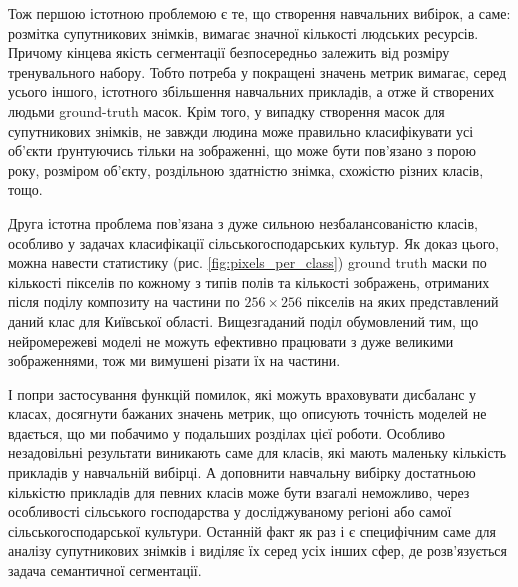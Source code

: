 Тож першою істотною проблемою є те, що створення
навчальних вибірок, а саме: розмітка супутникових знімків,
вимагає значної кількості людських ресурсів. Причому кінцева
якість сегментації безпосередньо залежить від
розміру тренувального набору. Тобто потреба у
покращені значень метрик вимагає, серед усього іншого,
істотного збільшення навчальних прикладів,
а отже й створених людьми ground-truth масок.
Крім того, у випадку створення масок для супутникових знімків,
не завжди людина може правильно класифікувати усі об'єкти ґрунтуючись
тільки на зображенні, що може бути пов'язано з порою року,
розміром об'єкту, роздільною здатністю знімка, схожістю різних класів, тощо.

Друга істотна проблема пов'язана з дуже сильною
незбалансованістю класів, особливо у задачах класифікації
сільськогосподарських культур. Як доказ цього, можна
навести статистику (рис. \ref{fig:pixels_per_class}) ground truth
маски по кількості пікселів по кожному з
типів полів та кількості зображень, отриманих після
поділу композиту на частини по $256 \times 256$ пікселів
на яких представлений даний клас для Київської області.
Вищезгаданий поділ обумовлений тим, що нейромережеві моделі не
можуть ефективно працювати з дуже великими зображеннями,
тож ми вимушені різати їх на частини.


І попри застосування
функцій помилок, які можуть враховувати дисбаланс у
класах, досягнути бажаних значень метрик, що описують точність
моделей не вдається, що ми побачимо у подальших розділах цієї роботи.
Особливо незадовільні результати виникають саме для класів,
які мають маленьку кількість прикладів у навчальній вибірці.
А доповнити навчальну вибірку достатньою кількістю
прикладів для певних класів може бути взагалі неможливо,
через особливості сільського господарства у досліджуваному регіоні
або самої сільськогосподарської культури. Останній факт як раз
і є специфічним саме для аналізу супутникових знімків і
виділяє їх серед усіх інших сфер,
де розв'язується задача семантичної сегментації.

\chapconclude{\ref{chap:review}}


